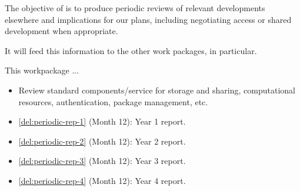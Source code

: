 \addtocounter{wpno}{1}
\begin{Workpackage}{\thewpno}
\WPTitle{\wpname{\thewpno}}

\begin{WPObjectives}
  The objective of \theWP{} is to produce periodic reviews of relevant
  developments elsewhere and implications for our plans, including
  negotiating access or shared development when appropriate.

  It will feed this information to the other work packages, in
  particular.
\end{WPObjectives}

\begin{WPDescription}
  This workpackage  ...

  \begin{itemize}
  \item Review standard components/service for storage and sharing,
    computational resources, authentication, package management, etc.
  \end{itemize}
\end{WPDescription}

\begin{WPDeliverables}
\begin{itemize}
\item
\ref{del:periodic-rep-1}
(Month 12): Year 1 report.
\item
\ref{del:periodic-rep-2}
(Month 12): Year 2 report.
\item
\ref{del:periodic-rep-3}
(Month 12): Year 3 report.
\item
\ref{del:periodic-rep-4}
(Month 12): Year 4 report.
\end{itemize}
\end{WPDeliverables}
\end{Workpackage}
